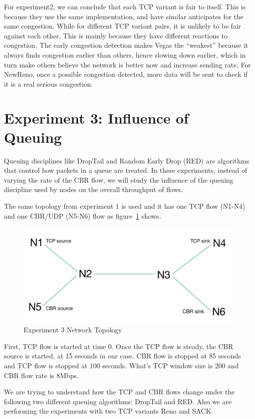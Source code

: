 \documentclass[10pt, conference]{lib/IEEEtran}
\begin{document}
For experiment2, we can conclude that each TCP variant is fair to itself. This is because they use the same implementation, and have 
similar anticipates for the same congestion. While for different TCP 
variant pairs, it is unlikely to be fair against each other. This is mainly because they have different reactions to congestion. The early
congestion detection makes Vegas the ``weakest'' because it always 
finds congestion earlier than others, hence slowing down earlier, 
which in turn make others believe the network is better now and 
increase sending rate. For NewReno, once a possible congestion 
detected, more data will be sent to check if it is a real serious 
congestion. 

\section{Experiment 3: Influence of Queuing}
Queuing disciplines like DropTail and Random Early Drop (RED) are 
algorithms that control how packets in a queue are treated. In these 
experiments, instead of varying the rate of the CBR flow, we will 
study the influence of the queuing discipline used by nodes on the 
overall throughput of flows.

The same topology from experiment 1 is used and it has one TCP flow 
(N1-N4) and one CBR/UDP (N5-N6) flow as figure~\ref{fig:exp3_tpg} shows.
\begin{figure}[!htb]
    \centering
    \includegraphics[width=0.8\linewidth]{images/top_exp3.png}
    \caption{Experiment 3 Network Topology}
    \label{fig:exp3_tpg}
\end{figure}
First, TCP flow is started at time 0. Once the TCP flow is steady, the
 CBR source is started, at 15 seconds in our case. CBR flow is stopped 
 at 85 seconds and TCP flow is stopped at 100 seconds. What's TCP 
 window size is 200 and CBR flow rate is 8Mbps.

We are trying to understand how the TCP and CBR flows change under the 
following two different queuing algorithms: DropTail and RED. Also we 
are performing the experiments with two TCP variants Reno and SACK.
\end{document}

